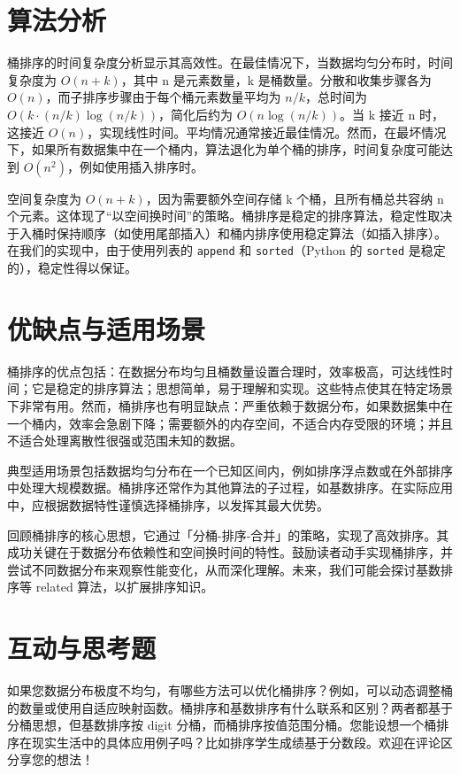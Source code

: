 \chapter{算法分析}
桶排序的时间复杂度分析显示其高效性。在最佳情况下，当数据均匀分布时，时间复杂度为 $O(n + k)$，其中 n 是元素数量，k 是桶数量。分散和收集步骤各为 $O(n)$，而子排序步骤由于每个桶元素数量平均为 $n/k$，总时间为 $O(k\cdot(n/k)\log(n/k))$，简化后约为 $O(n \log(n/k))$。当 k 接近 n 时，这接近 $O(n)$，实现线性时间。平均情况通常接近最佳情况。然而，在最坏情况下，如果所有数据集中在一个桶内，算法退化为单个桶的排序，时间复杂度可能达到 $O(n^2)$，例如使用插入排序时。\par
空间复杂度为 $O(n + k)$，因为需要额外空间存储 k 个桶，且所有桶总共容纳 n 个元素。这体现了“以空间换时间”的策略。桶排序是稳定的排序算法，稳定性取决于入桶时保持顺序（如使用尾部插入）和桶内排序使用稳定算法（如插入排序）。在我们的实现中，由于使用列表的 \texttt{append} 和 \texttt{sorted}（Python 的 \texttt{sorted} 是稳定的），稳定性得以保证。\par
\chapter{优缺点与适用场景}
桶排序的优点包括：在数据分布均匀且桶数量设置合理时，效率极高，可达线性时间；它是稳定的排序算法；思想简单，易于理解和实现。这些特点使其在特定场景下非常有用。然而，桶排序也有明显缺点：严重依赖于数据分布，如果数据集中在一个桶内，效率会急剧下降；需要额外的内存空间，不适合内存受限的环境；并且不适合处理离散性很强或范围未知的数据。\par
典型适用场景包括数据均匀分布在一个已知区间内，例如排序浮点数或在外部排序中处理大规模数据。桶排序还常作为其他算法的子过程，如基数排序。在实际应用中，应根据数据特性谨慎选择桶排序，以发挥其最大优势。\par
回顾桶排序的核心思想，它通过「分桶-排序-合并」的策略，实现了高效排序。其成功关键在于数据分布依赖性和空间换时间的特性。鼓励读者动手实现桶排序，并尝试不同数据分布来观察性能变化，从而深化理解。未来，我们可能会探讨基数排序等 related 算法，以扩展排序知识。\par
\chapter{互动与思考题}
如果您数据分布极度不均匀，有哪些方法可以优化桶排序？例如，可以动态调整桶的数量或使用自适应映射函数。桶排序和基数排序有什么联系和区别？两者都基于分桶思想，但基数排序按 digit 分桶，而桶排序按值范围分桶。您能设想一个桶排序在现实生活中的具体应用例子吗？比如排序学生成绩基于分数段。欢迎在评论区分享您的想法！\par
